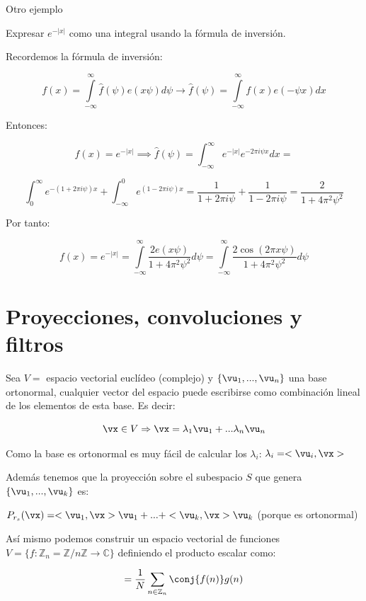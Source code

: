 \begin{example}{Otro ejemplo}

Expresar $e^{-|x|}$ como una integral usando la fórmula de inversión.


Recordemos la fórmula de inversión:

$$ f(x) = \int\limits^{\infty}_{-\infty} \hat{f}(\psi) e(x\psi) d\psi \rightarrow \hat{f}(\psi) = \int\limits^{\infty}_{-\infty} f(x) e(-\psi x) dx$$

Entonces:

$$f(x) = e^{-|x|} \implies \hat{f}(\psi) = \int_{-\infty}^{\infty} e^{-|x|} e ^{-2 \pi i \psi x} dx = $$

$$ \int_{0}^{\infty} e ^{-(1 + 2 \pi i \psi) x} + \int_{-\infty}^{0} e ^{(1 - 2 \pi i \psi) x} = \frac{1}{1 + 2\pi i \psi} + \frac{1}{1-2 \pi i \psi} = \frac{2}{1 + 4 \pi^2 \psi^2}$$

Por tanto:

$$f(x)=e^{-|x|} = \int\limits_{-\infty}^{\infty} \frac{2 e (x \psi)}{1 + 4 \pi^2 \psi^2} d \psi = \int\limits^{\infty}_{-\infty} \frac{2 \cos(2 \pi x \psi)}{1 + 4 \pi^2 \psi^2} d\psi $$

\end{example}

\section{Proyecciones, convoluciones y filtros}

Sea $V =$ espacio vectorial euclídeo (complejo) y $\{\vu_1, ..., \vu_n\}$ una base ortonormal, cualquier vector del espacio puede escribirse como combinación lineal de los elementos de esta base. Es decir:

\[\vx \in V \Rightarrow \vx = \lambda_1 \vu_1 + ... \lambda_n \vu_n\]

Como la base es ortonormal es muy fácil de calcular los $\lambda_i$: $\lambda_i = <\vu_i, \vx>$

Además tenemos que la proyección sobre el subespacio $S$ que genera $\{\vu_1,...,\vu_k\}$ es:

$ P_{r_s}(\vx) = <\vu_1, \vx>\vu_1 + ... + <\vu_k, \vx>\vu_k $ (porque es ortonormal)

Así mismo podemos construir un espacio vectorial de funciones $ V = \{f: \mathbb{Z}_n = \mathbb{Z}/n\mathbb{Z} \rightarrow \mathbb{C} \} $ definiendo el producto escalar como:

\[<f, g> = \frac{1}{N} \sum_{n \in \mathbb{Z}_n} \conj{f(n)} g(n)\]



